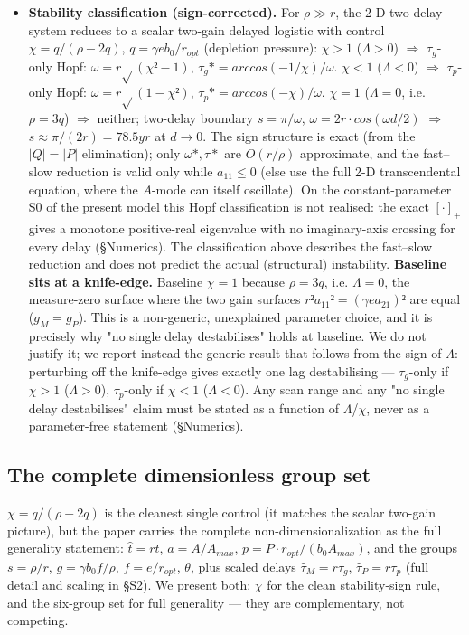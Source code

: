 \documentclass[11pt]{article}
\begin{document}
\begin{itemize}
\item \textbf{Stability classification (sign-corrected).} For $\rho{} \gg{} r$, the 2-D two-delay system reduces to a scalar two-gain delayed logistic with control $\chi{} = q/(\rho{} - 2q)$, $q = \gamma{} e b_{0}/r_{opt}$ (depletion pressure): $\chi{} > 1$ ($\Lambda{} > 0$) \ensuremath{\Rightarrow{}} $\tau{}_{g}$-only Hopf: $\omega{} = r\sqrt{}(\chi{}²-1)$, $\tau{}_{g}* = arccos(-1/\chi{})/\omega{}$. $\chi{} < 1$ ($\Lambda{} < 0$) \ensuremath{\Rightarrow{}} $\tau{}_{p}$-only Hopf: $\omega{} = r\sqrt{}(1-\chi{}²)$, $\tau{}_{p}* = arccos(-\chi{})/\omega{}$. $\chi{} = 1$ ($\Lambda{} = 0$, i.e. $\rho{} = 3q$) \ensuremath{\Rightarrow{}} neither; two-delay boundary $s = \pi{}/\omega{}$, $\omega{} = 2r\cdot{}cos(\omega{}d/2)$ \ensuremath{\Rightarrow{}} $s \approx{} \pi{}/(2r) = 78.5 yr$ at $d \to{} 0$. The sign structure is exact (from the $|Q| = |P|$ elimination); only $\omega{}*, \tau{}*$ are $O(r/\rho{})$ approximate, and the fast–slow reduction is valid only while $a_{11} \leq{} 0$ (else use the full 2-D transcendental equation, where the $A$-mode can itself oscillate). On the constant-parameter S0 of the present model this Hopf classification is not realised: the exact $[\cdot{}]_{+}$ gives a monotone positive-real eigenvalue with no imaginary-axis crossing for every delay (§Numerics). The classification above describes the fast–slow reduction and does not predict the actual (structural) instability. \textbf{Baseline sits at a knife-edge.} Baseline $\chi{} = 1$ because $\rho{} = 3q$, i.e. $\Lambda{} = 0$, the measure-zero surface where the two gain surfaces $r²a_{11}² = (\gamma{} e a_{21})²$ are equal ($g_{M} = g_{P}$). This is a non-generic, unexplained parameter choice, and it is precisely why "no single delay destabilises" holds at baseline. We do not justify it; we report instead the generic result that follows from the sign of $\Lambda{}$: perturbing off the knife-edge gives exactly one lag destabilising — $\tau{}_{g}$-only if $\chi{} > 1$ ($\Lambda{} > 0$), $\tau{}_{p}$-only if $\chi{} < 1$ ($\Lambda{} < 0$). Any scan range and any "no single delay destabilises" claim must be stated as a function of $\Lambda{}$/$\chi{}$, never as a parameter-free statement (§Numerics).
\end{itemize}

\subsection{The complete dimensionless group set}

$\chi{} = q/(\rho{}-2q)$ is the cleanest single control (it matches the scalar two-gain picture), but the paper carries the complete non-dimensionalization as the full generality statement: $\hat{t} = rt$, $a = A/A_{max}$, $p = P\cdot{}r_{opt}/(b_{0}A_{max})$, and the groups $s = \rho{}/r$, $g = \gamma{} b_{0} f/\rho{}$, $f = e/r_{opt}$, $\theta{}$, plus scaled delays $\hat{\tau{}}_{M} = r\tau{}_{g}$, $\hat{\tau{}}_{P} = r\tau{}_{p}$ (full detail and scaling in §S2). We present both: $\chi{}$ for the clean stability-sign rule, and the six-group set for full generality — they are complementary, not competing.
\end{document}

